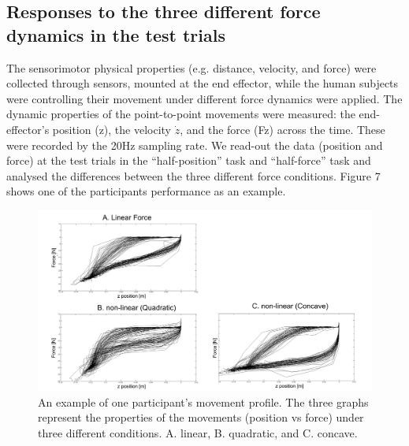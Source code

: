 \subsection{Responses to the three different force dynamics in the test trials}
The sensorimotor physical properties (e.g. distance, velocity, and force) were collected through sensors, mounted at the end effector, while the human subjects were controlling their movement under different force dynamics were applied. The dynamic properties of the point-to-point movements were measured: the end-effector’s position (z), the velocity $\dot{z}$, and the force (Fz) across the time. These were recorded by the 20Hz sampling rate. We read-out the data (position and force) at the test trials in the “half-position” task and “half-force” task and analysed the differences between the three different force conditions. Figure 7 shows one of the participants performance as an example.
%
\begin{figure}
  \centering
  \includegraphics[scale=0.5]{Chie/figs/Figure7.png}
  \caption{An example of one participant’s movement profile. The three graphs represent the properties of the movements (position vs force) under three different conditions. A. linear, B. quadratic, and C. concave.}
  \label{modelling}
\end{figure}
